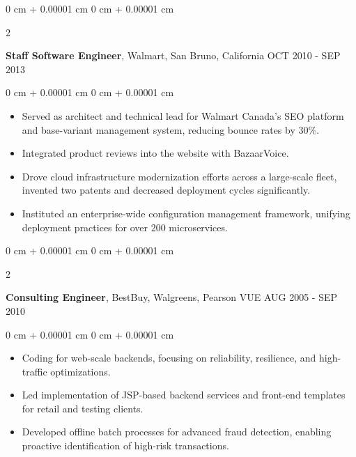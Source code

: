 \documentclass[10pt, letterpaper]{article}
\newenvironment{highlights}{
    \begin{itemize}[
        topsep=0.10 cm,
        parsep=0.10 cm,
        partopsep=0pt,
        itemsep=0pt,
        leftmargin=0 cm + 10pt
    ]
}{
    \end{itemize}
} %
\newenvironment{onecolentry}{
    \begin{adjustwidth}{
        0 cm + 0.00001 cm
    }{
        0 cm + 0.00001 cm
    }
}{
    \end{adjustwidth}
} %
\newenvironment{twocolentry}[2][]{
    \onecolentry
    \def\secondColumn{#2}
    \setcolumnwidth{\fill, 4.5 cm}
    \begin{paracol}{2}
}{
    \switchcolumn \raggedleft \secondColumn
    \end{paracol}
    \endonecolentry
} %
\begin{document}
        \vspace{0.20 cm}
        \begin{twocolentry}{
            OCT 2010 - SEP 2013
        }
            \textbf{Staff Software Engineer}, Walmart, San Bruno, California\end{twocolentry}
        \vspace{0.10 cm}
        \begin{onecolentry}
            \begin{highlights}
                \item Served as architect and technical lead for Walmart Canada's SEO platform and base-variant management system, reducing bounce rates by 30\%.
                \item Integrated product reviews into the website with BazaarVoice.
                \item Drove cloud infrastructure modernization efforts across a large-scale fleet, invented two patents and decreased deployment cycles significantly.
                \item Instituted an enterprise-wide configuration management framework, unifying deployment practices for over 200 microservices.
            \end{highlights}
        \end{onecolentry}

        \vspace{0.20 cm}
        \begin{twocolentry}{
            AUG 2005 - SEP 2010
        }
            \textbf{Consulting Engineer}, BestBuy, Walgreens, Pearson VUE\end{twocolentry}
        \vspace{0.10 cm}
        \begin{onecolentry}
            \begin{highlights}
                \item Coding for web-scale backends, focusing on reliability, resilience, and high-traffic optimizations.
                \item Led implementation of JSP-based backend services and front-end templates for retail and testing clients.
                \item Developed offline batch processes for advanced fraud detection, enabling proactive identification of high-risk transactions.
            \end{highlights}
        \end{onecolentry}
\end{document}
